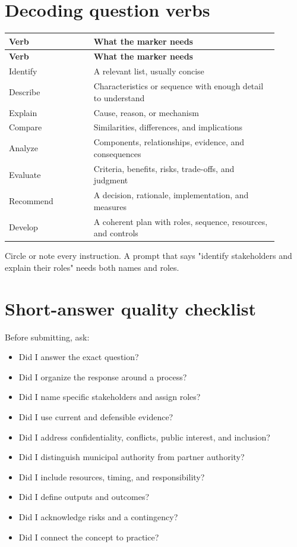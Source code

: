 \documentclass[11pt,letterpaper,oneside,openany]{book}
\begin{document}
\section[Decoding question verbs]{Decoding question verbs}
\begin{center}
\small
\setlength{\LTpre}{0.4em}
\setlength{\LTpost}{0.8em}
\begin{longtable}{>{\RaggedRight\arraybackslash}p{0.290\linewidth}>{\RaggedRight\arraybackslash}p{0.610\linewidth}}
\rowcolor{DeepNavy}
\color{white}\bfseries Verb & \color{white}\bfseries What the marker needs \\
\endfirsthead
\rowcolor{DeepNavy}
\color{white}\bfseries Verb & \color{white}\bfseries What the marker needs \\
\endhead
Identify & A relevant list, usually concise \\
Describe & Characteristics or sequence with enough detail to understand \\
Explain & Cause, reason, or mechanism \\
Compare & Similarities, differences, and implications \\
Analyze & Components, relationships, evidence, and consequences \\
Evaluate & Criteria, benefits, risks, trade-offs, and judgment \\
Recommend & A decision, rationale, implementation, and measures \\
Develop & A coherent plan with roles, sequence, resources, and controls \\
\end{longtable}
\end{center}
Circle or note every instruction. A prompt that says "identify stakeholders and explain their roles" needs both names and roles.


\section[Short-answer quality checklist]{Short-answer quality checklist}
Before submitting, ask:


\begin{itemize}
\item Did I answer the exact question?
\item Did I organize the response around a process?
\item Did I name specific stakeholders and assign roles?
\item Did I use current and defensible evidence?
\item Did I address confidentiality, conflicts, public interest, and inclusion?
\item Did I distinguish municipal authority from partner authority?
\item Did I include resources, timing, and responsibility?
\item Did I define outputs and outcomes?
\item Did I acknowledge risks and a contingency?
\item Did I connect the concept to practice?
\end{itemize}
\end{document}
